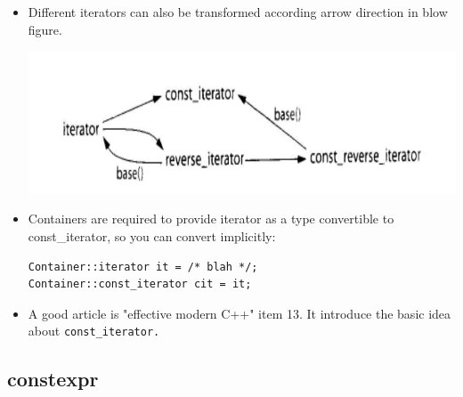 \documentclass[a4paper,11pt,twoside]{book}
\begin{document}
\begin{itemize}
	\item Different iterators can also be transformed according arrow direction in blow figure.
\begin{center}
		\includegraphics[width=0.6\linewidth]{pics/Iterators.png}
\end{center}
	\item Containers are required to provide iterator as a type convertible to const\_iterator, so you can convert implicitly:
\begin{lstlisting}	
Container::iterator it = /* blah */;
Container::const_iterator cit = it;	
\end{lstlisting}
			
	\item A good article is "effective modern C++" item 13. It introduce the basic idea about \texttt{const\_iterator.}
\end{itemize}

\subsection{constexpr}
\end{document}
